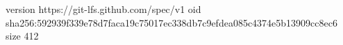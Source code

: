 version https://git-lfs.github.com/spec/v1
oid sha256:592939f339e78d7faca19c75017ec338db7c9efdea085c4374e5b13909cc8ec6
size 412
